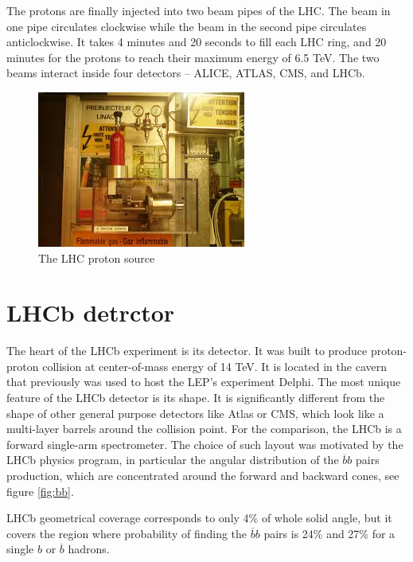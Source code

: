 The protons are finally injected into two beam pipes of the LHC. The beam in one pipe circulates clockwise while the beam in the second pipe circulates anticlockwise. It takes 4 minutes and 20 seconds to fill each LHC ring, and 20 minutes for the protons to reach their maximum energy of 6.5 TeV. The two beams interact inside four detectors – ALICE, ATLAS, CMS, and LHCb.

\begin{figure}
\centering
\includegraphics[scale=0.6]{figures/Bottle.jpg}
\caption{The LHC proton source 
\label{fig:Bottle}}
\end{figure}



\section{LHCb detrctor}

The heart of the LHCb experiment is its detector. It was built to produce proton-proton collision at center-of-mass energy of 14 TeV. It is located in the cavern that previously was used to host the LEP's experiment Delphi. The most unique feature of the LHCb detector is its shape. It is significantly different from the shape of other general purpose detectors like Atlas or CMS, which look like a multi-layer barrels around the collision point. For the comparison, the LHCb is a forward single-arm spectrometer. The choice of such layout was motivated by the LHCb physics program, in particular the angular distribution of the $\overline{b}b$ pairs production, which are concentrated around the forward and backward cones, see figure \ref{fig:bb}.

LHCb geometrical coverage corresponds to only 4\% of whole solid angle, but it covers the region where probability of finding the  $\overline{b}b$ pairs is 24\% and 27\% for a single $b$ or $\overline{b}$ hadrons. 


